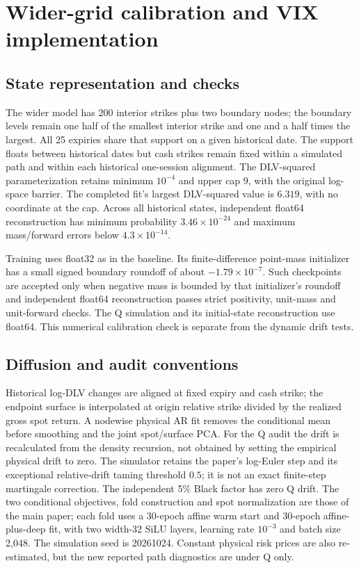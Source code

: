 \section{Wider-grid calibration and VIX implementation}
\label{app:wide-grid-details}

\subsection{State representation and checks}
The wider model has 200 interior strikes plus two boundary nodes; the
boundary levels remain one half of the smallest interior strike and one
and a half times the largest. All 25 expiries share that support on a given
historical date. The support floats between historical dates but cash
strikes remain fixed within a simulated path and within each historical
one-session alignment. The DLV-squared parameterization retains minimum
$10^{-4}$ and upper cap $9$, with the original log-space barrier. The
completed fit's largest DLV-squared value is $6.319$, with no coordinate
at the cap. Across all historical states, independent float64 reconstruction
has minimum probability $3.46\times10^{-24}$ and maximum mass/forward errors
below $4.3\times10^{-14}$.

Training uses float32 as in the baseline. Its finite-difference point-mass
initializer has a small signed boundary roundoff of about
$-1.79\times10^{-7}$. Such checkpoints are accepted only when negative
mass is bounded by that initializer's roundoff and independent float64
reconstruction passes strict positivity, unit-mass and unit-forward checks.
The Q simulation and its initial-state reconstruction use float64.
This numerical calibration check is separate from the dynamic drift tests.

\subsection{Diffusion and audit conventions}
\label{sec:wide-audit-definition}
Historical log-DLV changes are aligned at fixed expiry and cash strike;
the endpoint surface is interpolated at origin relative strike divided by
the realized gross spot return. A nodewise physical AR fit removes the
conditional mean before smoothing and the joint spot/surface PCA.
For the Q audit the drift is recalculated from the density recursion,
not obtained by setting the empirical physical drift to zero.
The simulator retains the paper's log-Euler step and its exceptional
relative-drift taming threshold $0.5$; it is not an exact finite-step
martingale correction. The independent 5\% Black factor has zero Q drift.
The two conditional objectives, fold construction and spot normalization
are those of the main paper; each
fold uses a 30-epoch affine warm start and 30-epoch affine-plus-deep fit,
with two width-32 SiLU layers, learning rate $10^{-3}$ and batch size 2,048.
The simulation seed is 20261024. Constant physical risk prices are also
re-estimated, but the new reported path diagnostics are under Q only.

